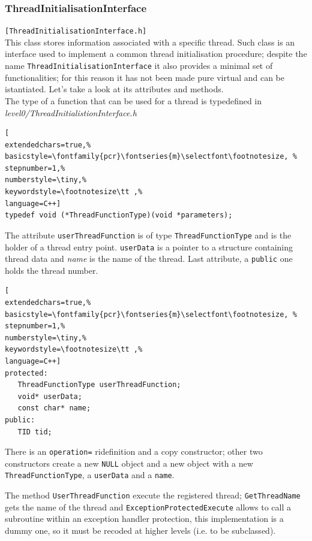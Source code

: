 \subsubsection{ThreadInitialisationInterface}
\texttt{[ThreadInitialisationInterface.h]}\\
This class stores information associated with a specific thread. Such class is an interface used to implement a common thread initialisation procedure; despite the name \texttt{ThreadInitialisationInterface} it also provides a minimal set of functionalities; for this reason it has not been made pure virtual and can be istantiated. Let's take a look at its attributes and methods.\\

The type of a function that can be used for a thread is typedefined in \textit{level0/ThreadInitialistionInterface.h}
\begin{lstlisting}[
extendedchars=true,%
basicstyle=\fontfamily{pcr}\fontseries{m}\selectfont\footnotesize, %
stepnumber=1,%
numberstyle=\tiny,%
keywordstyle=\footnotesize\tt ,%
language=C++]
typedef void (*ThreadFunctionType)(void *parameters);
\end{lstlisting}
The attribute \texttt{userThreadFunction} is of type \texttt{ThreadFunctionType} and is the holder of a thread entry point. \texttt{userData} is
 a pointer to a structure containing thread data and \textit{name} is the name of the thread. Last attribute, a \texttt{public} one holds the thread number.

\begin{lstlisting}[
extendedchars=true,%
basicstyle=\fontfamily{pcr}\fontseries{m}\selectfont\footnotesize, %
stepnumber=1,%
numberstyle=\tiny,%
keywordstyle=\footnotesize\tt ,%
language=C++]
protected:
   ThreadFunctionType userThreadFunction;
   void* userData;
   const char* name;
public:
   TID tid;
\end{lstlisting}

There is an \texttt{operation=} ridefinition and a copy constructor; other two constructors create a new \texttt{NULL} object and a new object with a new \texttt{ThreadFunctionType}, a \texttt{userData} and a \texttt{name}.

The method \texttt{UserThreadFunction} execute the registered thread; \texttt{GetThreadName} gets the name of the thread and \texttt{ExceptionProtectedExecute} allows to call a subroutine within an exception handler protection, this implementation is a dummy one, so it must be recoded at higher levels (i.e. to be subclassed).

